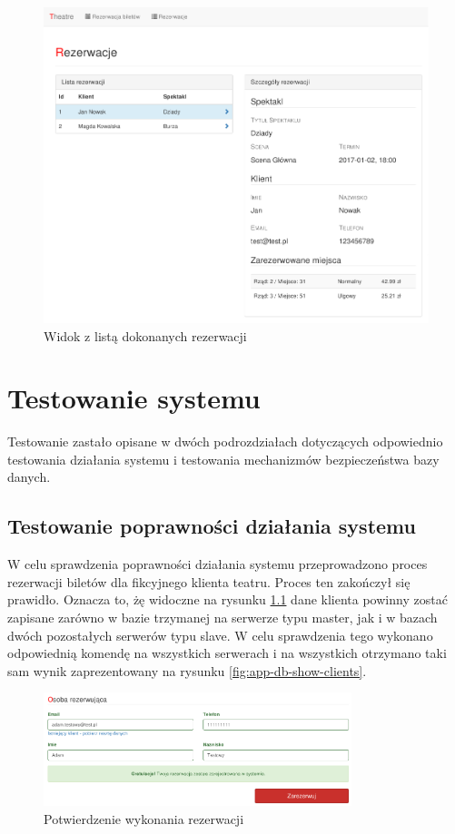 \documentclass{mgr}
\begin{document}
\begin{figure}[!ht]
	\centering
	\includegraphics[width=\textwidth]{images/reservations.png}
	\caption{Widok z listą dokonanych rezerwacji}
	\label{fig:reservations}
\end{figure}

\chapter{Testowanie systemu}
Testowanie zastało opisane w dwóch podrozdziałach dotyczących odpowiednio testowania działania systemu i testowania mechanizmów bezpieczeństwa bazy danych.

\section{Testowanie poprawności działania systemu}
W celu sprawdzenia poprawności działania systemu przeprowadzono proces rezerwacji biletów dla fikcyjnego klienta teatru. Proces ten zakończył się prawidło. Oznacza to, żę widoczne na rysunku \ref{fig:app-reservation-success} dane klienta powinny zostać zapisane zarówno w bazie trzymanej na serwerze typu master, jak i w bazach dwóch pozostałych serwerów typu slave. W celu sprawdzenia tego wykonano odpowiednią komendę na wszystkich serwerach i na wszystkich otrzymano taki sam wynik zaprezentowany na rysunku \ref{fig:app-db-show-clients}.

\begin{figure}[!ht]
	\centering
	\includegraphics[width=0.8\textwidth]{images/app_reservation_success.png}
	\caption{Potwierdzenie wykonania rezerwacji}
	\label{fig:app-reservation-success}
\end{figure}
\end{document}
